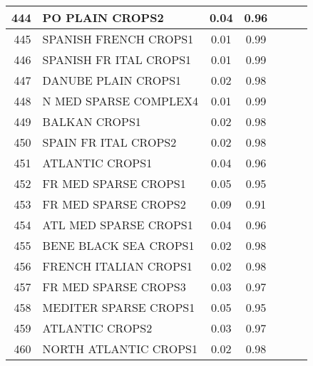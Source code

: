 {{\begin{tabular}{||r|l||c|c|c|c|c||}
 \hline
         444  & PO PLAIN CROPS2                                              &  0.04 &  0.96 &       &       \\
 \hline
         445  & SPANISH FRENCH CROPS1                                        &  0.01 &  0.99 &       &       \\
 \hline
         446  & SPANISH FR ITAL CROPS1                                       &  0.01 &  0.99 &       &       \\
 \hline
         447  & DANUBE PLAIN CROPS1                                          &  0.02 &  0.98 &       &       \\
 \hline
         448  & N MED SPARSE COMPLEX4                                        &  0.01 &  0.99 &       &       \\
 \hline
         449  & BALKAN CROPS1                                                &  0.02 &  0.98 &       &       \\
 \hline
         450  & SPAIN FR ITAL CROPS2                                         &  0.02 &  0.98 &       &       \\
 \hline
         451  & ATLANTIC CROPS1                                              &  0.04 &  0.96 &       &       \\
 \hline
         452  & FR MED SPARSE CROPS1                                         &  0.05 &  0.95 &       &       \\
 \hline
         453  & FR MED SPARSE CROPS2                                         &  0.09 &  0.91 &       &       \\
 \hline
         454  & ATL MED SPARSE CROPS1                                        &  0.04 &  0.96 &       &       \\
 \hline
         455  & BENE BLACK SEA CROPS1                                        &  0.02 &  0.98 &       &       \\
 \hline
         456  & FRENCH ITALIAN CROPS1                                        &  0.02 &  0.98 &       &       \\
 \hline
         457  & FR MED SPARSE CROPS3                                         &  0.03 &  0.97 &       &       \\
 \hline
         458  & MEDITER SPARSE CROPS1                                        &  0.05 &  0.95 &       &       \\
 \hline
         459  & ATLANTIC CROPS2                                              &  0.03 &  0.97 &       &       \\
 \hline
         460  & NORTH ATLANTIC CROPS1                                        &  0.02 &  0.98 &       &       \\

\end{tabular}}}
